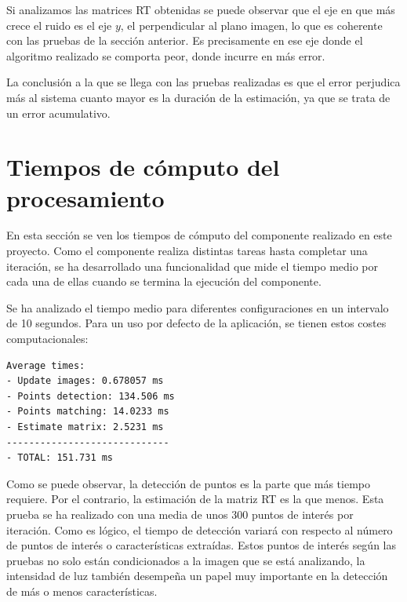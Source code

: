 %

Si analizamos las matrices RT obtenidas se puede observar que el eje en que más crece el ruido es el eje $y$, el perpendicular al plano imagen, lo que es coherente con las pruebas de la sección anterior. Es precisamente en ese eje donde el algoritmo realizado se comporta peor, donde incurre en más error.

La conclusión a la que se llega con las pruebas realizadas es que el error perjudica más al sistema cuanto mayor es la duración de la estimación, ya que se trata de un error acumulativo.


\newpage
\section{Tiempos de cómputo del procesamiento}
En esta sección se ven los tiempos de cómputo del componente realizado en este proyecto. Como el componente realiza distintas tareas hasta completar una iteración, se ha desarrollado una funcionalidad que mide el tiempo medio por cada una de ellas cuando se termina la ejecución del componente.

Se ha analizado el tiempo medio para diferentes configuraciones en un intervalo de 10 segundos. Para un uso por defecto de la aplicación, se tienen estos costes computacionales:

\begin{lstlisting}[style=CStyle]
Average times:
- Update images: 0.678057 ms
- Points detection: 134.506 ms
- Points matching: 14.0233 ms
- Estimate matrix: 2.5231 ms
-----------------------------
- TOTAL: 151.731 ms
\end{lstlisting}

Como se puede observar, la detección de puntos es la parte que más tiempo requiere. Por el contrario, la estimación de la matriz RT es la que menos. Esta prueba se ha realizado con una media de unos 300 puntos de interés por iteración. Como es lógico, el tiempo de detección variará con respecto al número de puntos de interés o características extraídas. Estos puntos de interés según las pruebas no solo están condicionados a la imagen que se está analizando, la intensidad de luz también desempeña un papel muy importante en la detección de más o menos características.

